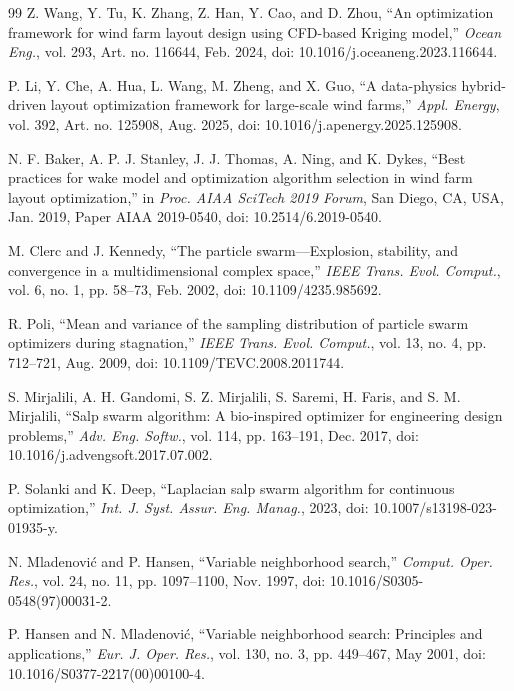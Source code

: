 \documentclass[journal,twoside]{IEEEtran}
\begin{document}
\begin{thebibliography}{99}
Z. Wang, Y. Tu, K. Zhang, Z. Han, Y. Cao, and D. Zhou, ``An optimization framework for wind farm layout design using CFD-based Kriging model,'' \textit{Ocean Eng.}, vol. 293, Art. no. 116644, Feb. 2024, doi: 10.1016/j.oceaneng.2023.116644.

P. Li, Y. Che, A. Hua, L. Wang, M. Zheng, and X. Guo, ``A data-physics hybrid-driven layout optimization framework for large-scale wind farms,'' \textit{Appl. Energy}, vol. 392, Art. no. 125908, Aug. 2025, doi: 10.1016/j.apenergy.2025.125908.

N. F. Baker, A. P. J. Stanley, J. J. Thomas, A. Ning, and K. Dykes, ``Best practices for wake model and optimization algorithm selection in wind farm layout optimization,'' in \textit{Proc. AIAA SciTech 2019 Forum}, San Diego, CA, USA, Jan. 2019, Paper AIAA 2019-0540, doi: 10.2514/6.2019-0540.

M. Clerc and J. Kennedy, ``The particle swarm---Explosion, stability, and convergence in a multidimensional complex space,'' \textit{IEEE Trans. Evol. Comput.}, vol. 6, no. 1, pp. 58--73, Feb. 2002, doi: 10.1109/4235.985692.

R. Poli, ``Mean and variance of the sampling distribution of particle swarm optimizers during stagnation,'' \textit{IEEE Trans. Evol. Comput.}, vol. 13, no. 4, pp. 712--721, Aug. 2009, doi: 10.1109/TEVC.2008.2011744.

S. Mirjalili, A. H. Gandomi, S. Z. Mirjalili, S. Saremi, H. Faris, and S. M. Mirjalili, ``Salp swarm algorithm: A bio-inspired optimizer for engineering design problems,'' \textit{Adv. Eng. Softw.}, vol. 114, pp. 163--191, Dec. 2017, doi: 10.1016/j.advengsoft.2017.07.002.

P. Solanki and K. Deep, ``Laplacian salp swarm algorithm for continuous optimization,'' \textit{Int. J. Syst. Assur. Eng. Manag.}, 2023, doi: 10.1007/s13198-023-01935-y.

N. Mladenovi\'c and P. Hansen, ``Variable neighborhood search,'' \textit{Comput. Oper. Res.}, vol. 24, no. 11, pp. 1097--1100, Nov. 1997, doi: 10.1016/S0305-0548(97)00031-2.

P. Hansen and N. Mladenovi\'c, ``Variable neighborhood search: Principles and applications,'' \textit{Eur. J. Oper. Res.}, vol. 130, no. 3, pp. 449--467, May 2001, doi: 10.1016/S0377-2217(00)00100-4.


\end{thebibliography}
\end{document}
